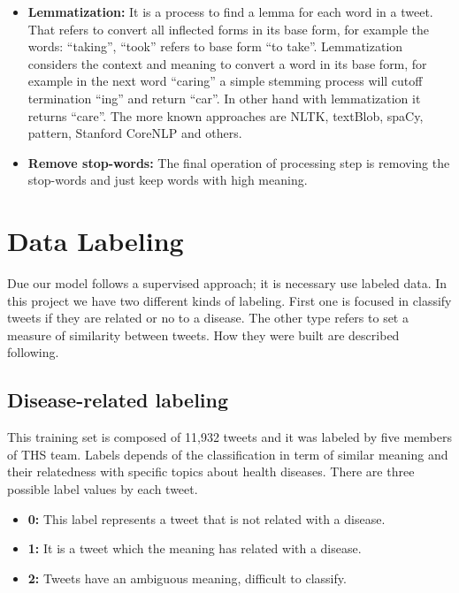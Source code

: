 \documentclass[12pt]{report}
\begin{document}
\begin{itemize}[nolistsep]
	\item \textbf{Lemmatization:} It is a process to find a lemma for each word in a tweet. That refers to convert all inflected forms in its base form, for example the words: “taking”, “took” refers to base form “to take”. Lemmatization considers the context and meaning to convert a word in its base form, for example in the next word “caring” a simple stemming process will cutoff termination “ing” and return “car”. In other hand with lemmatization it returns “care”. The more known approaches are \ac{NLTK}, textBlob, spaCy, pattern, Stanford CoreNLP and others. 

	\item \textbf{Remove stop-words:} The final operation of processing step is removing the stop-words and just keep words with high meaning.
\end{itemize}

\section{Data Labeling} \label{data_labeling}

Due our model follows a supervised approach; it is necessary use labeled data. In this project we have two different kinds of labeling. First one is focused in classify tweets if they are related or no to a disease. The other type refers to set a measure of similarity between tweets. How they were built are described following.

\subsection{Disease-related labeling}

This training set is composed of 11,932 tweets and it was labeled by five members of \ac{THS} team. Labels depends of the classification in term of similar meaning and their relatedness with specific topics about health diseases. There are three possible label values by each tweet. 

\begin{itemize} [nolistsep]
	\item \textbf{0:} This label represents a tweet that is not related with a disease. 
	\item \textbf{1:} It is a tweet which the meaning has related with a disease.
	\item \textbf{2:} Tweets have an ambiguous meaning, difficult to classify.
\end{itemize}
\end{document}
